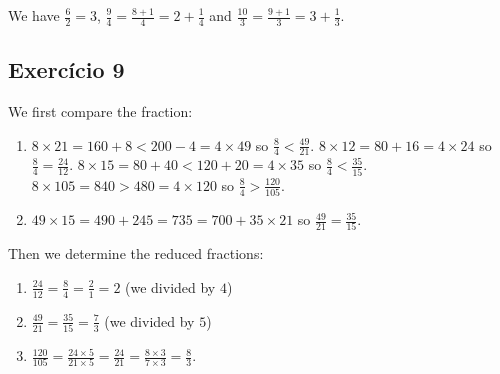 We have $\frac{6}{2} = 3$, $\frac{9}{4} = \frac{8+1}{4} = 2+\frac{1}{4}$
and $\frac{10}{3} = \frac{9+1}{3} = 3 + \frac{1}{3}$.

\begin{center}
\end{center}


\subsection*{Exercício 9}

We first compare the fraction:
\begin{enumerate}
\item $8 \times 21 = 160 + 8 < 200 - 4 = 4 \times 49$ so
$\frac{8}{4} < \frac{49}{21}$.
$8 \times 12 = 80+16=4 \times 24$ so $\frac{8}{4} = \frac{24}{12}$.
$8 \times 15 = 80+40 <  120+20 = 4 \times35$ so
$\frac{8}{4} < \frac{35}{15}$.
$8 \times 105 = 840 > 480 = 4 \times 120$ so
$\frac{8}{4} > \frac{120}{105}$.

\item $49 \times 15 = 490 + 245 = 735 = 700 + 35 \times 21$ so
$\frac{49}{21} = \frac{35}{15}$.
\end{enumerate}

Then we determine the reduced fractions:

\begin{enumerate}

\item
  $\frac{24}{12}=\frac{8}{4}=\frac{2}{1}=2$ (we divided by $4$)
\item
  $\frac{49}{21}=\frac{35}{15}=\frac{7}{3}$ (we divided by $5$)

\item
  $\frac{120}{105} = \frac{24\times5}{21\times5}=
  \frac{24}{21}=\frac{8\times3}{7\times3} = \frac{8}{3}$.
\end{enumerate}

